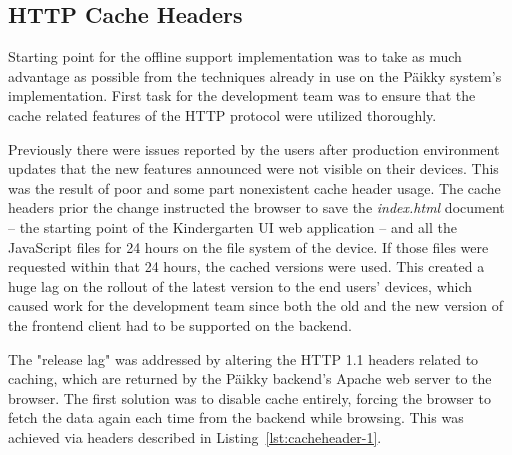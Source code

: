 \subsection{HTTP Cache Headers}
\label{subsec:cacheheaders}


Starting point for the offline support implementation was to take as much advantage as possible from the techniques already in use on the Päikky system's implementation. First task for the development team was to ensure that the cache related features of the HTTP protocol were utilized thoroughly.

Previously there were issues reported by the users after production environment updates that the new features announced were not visible on their devices. This was the result of poor and some part nonexistent cache header usage. The cache headers prior the change instructed the browser to save the \textit{index.html} document -- the starting point of the Kindergarten UI web application -- and all the JavaScript files for 24 hours on the file system of the device. If those files were requested within that 24 hours, the cached versions were used. This created a huge lag on the rollout of the latest version to the end users' devices, which caused work for the development team since both the old and the new version of the frontend client had to be supported on the backend.

The "release lag" was addressed by altering the HTTP 1.1 headers related to caching, which are returned by the Päikky backend's Apache web server to the browser. The first solution was to disable cache entirely, forcing the browser to fetch the data again each time from the backend while browsing. This was achieved via headers described in Listing~\ref{lst:cacheheader-1}.


